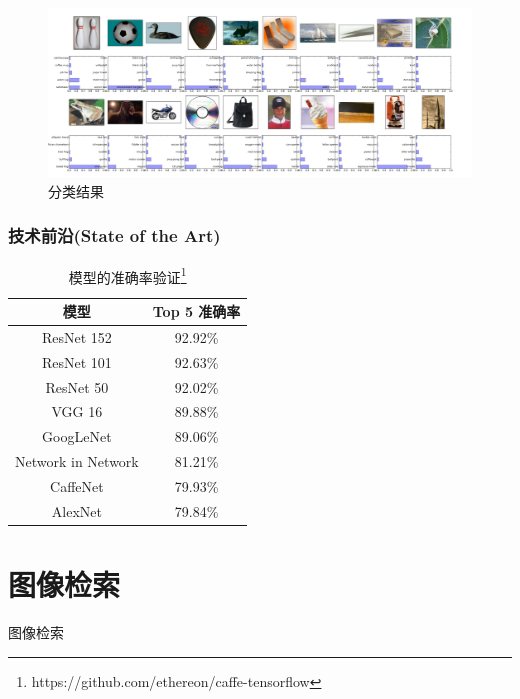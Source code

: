 \documentclass[table]{beamer}
\begin{document}
\begin{frame}
	\begin{figure}
		\includegraphics[width=\textwidth]{classification.pdf}
		\caption{分类结果}
		\label{fig:class}
	\end{figure}
	{\color{red}{现场演示(classification.py)......}}
\end{frame}

\begin{frame}
	\frametitle{技术前沿(State of the Art)}
	\begin{table}
		\begin{tabular}{|c|c|} \hline
			\rowcolor{gray!25} 模型 & Top 5 准确率 \\ \hline
			ResNet 152               & 92.92\%        \\ \hline
			ResNet 101               & 92.63\%        \\ \hline
			ResNet 50                & 92.02\%        \\ \hline
			VGG 16                   & 89.88\%        \\ \hline
			GoogLeNet                & 89.06\%        \\ \hline
			Network in Network       & 81.21\%        \\ \hline
			CaffeNet                 & 79.93\%        \\ \hline
			AlexNet                  & 79.84\%        \\ \hline
		\end{tabular}
		\caption{模型的准确率验证\footnote{https://github.com/ethereon/caffe-tensorflow}}
	\end{table}
\end{frame}

\section{图像检索}
\begin{frame}
	\begin{center}
		\vspace{0.1cm}
		\Huge{图像检索}
	\end{center}
\end{frame}
\end{document}
